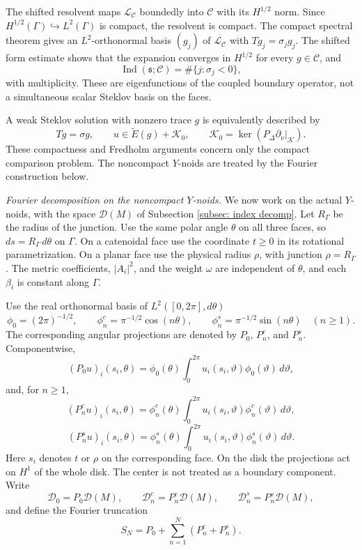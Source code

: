 \documentclass[11pt,twoside]{amsart}
\numberwithin{equation}{section}
\begin{document}
The shifted resolvent maps $\mathscr L_\mathcal C$ boundedly into $\mathcal C$ with its $H^{1/2}$ norm. Since $H^{1/2}(\Gamma)\hookrightarrow L^2(\Gamma)$ is compact, the resolvent is compact. The compact spectral theorem gives an $L^2$-orthonormal basis $(g_j)$ of $\mathscr L_\mathcal C$ with $Tg_j=\sigma_jg_j$. The shifted form estimate shows that the expansion converges in $H^{1/2}$ for every $g\in\mathcal C$, and
\[
\operatorname{Ind}(\mathfrak s;\mathcal C)=\#\{j:\sigma_j<0\},
\]
with multiplicity. These are eigenfunctions of the coupled boundary operator, not a simultaneous scalar Steklov basis on the faces.

A weak Steklov solution with nonzero trace $g$ is equivalently described by
\[
Tg=\sigma g,
\qquad
u\in\widetilde E(g)+\mathcal K_0,
\qquad
\mathcal K_0=\ker(P_\Delta\partial_\nu|_\mathcal K).
\]
These compactness and Fredholm arguments concern only the compact comparison problem. The noncompact $Y$-noids are treated by the Fourier construction below.

\medskip
\noindent\emph{Fourier decomposition on the noncompact $Y$-noids.}
We now work on the actual $Y$-noids, with the space $\mathcal D(M)$ of Subsection \ref{subsec: index decomp}. Let $R_\Gamma$ be the radius of the junction. Use the same polar angle $\theta$ on all three faces, so $ds=R_\Gamma\,d\theta$ on $\Gamma$. On a catenoidal face use the coordinate $t\geq0$ in its rotational parametrization. On a planar face use the physical radius $\rho$, with junction $\rho=R_\Gamma$. The metric coefficients, $|A_i|^2$, and the weight $\omega$ are independent of $\theta$, and each $\beta_i$ is constant along $\Gamma$.

Use the real orthonormal basis of $L^2([0,2\pi],d\theta)$
\[
\phi_0=(2\pi)^{-1/2},\qquad
\phi_n^c=\pi^{-1/2}\cos(n\theta),\qquad
\phi_n^s=\pi^{-1/2}\sin(n\theta)\quad(n\geq1).
\]
The corresponding angular projections are denoted by $P_0$, $P_n^c$, and $P_n^s$. Componentwise,
\[
(P_0u)_i(s_i,\theta)
=\phi_0(\theta)\int_0^{2\pi}u_i(s_i,\vartheta)\phi_0(\vartheta)\,d\vartheta,
\]
and, for $n\ge1$,
\[
(P_n^cu)_i(s_i,\theta)
=\phi_n^c(\theta)\int_0^{2\pi}u_i(s_i,\vartheta)\phi_n^c(\vartheta)\,d\vartheta,
\]
\[
(P_n^su)_i(s_i,\theta)
=\phi_n^s(\theta)\int_0^{2\pi}u_i(s_i,\vartheta)\phi_n^s(\vartheta)\,d\vartheta.
\]
Here $s_i$ denotes $t$ or $\rho$ on the corresponding face. On the disk the projections act on $H^1$ of the whole disk. The center is not treated as a boundary component. Write
\[
\mathcal D_0=P_0\mathcal D(M),\qquad
\mathcal D_n^c=P_n^c\mathcal D(M),\qquad
\mathcal D_n^s=P_n^s\mathcal D(M),
\]
and define the Fourier truncation
\[
S_N=P_0+\sum_{n=1}^N(P_n^c+P_n^s).
\]
\end{document}
